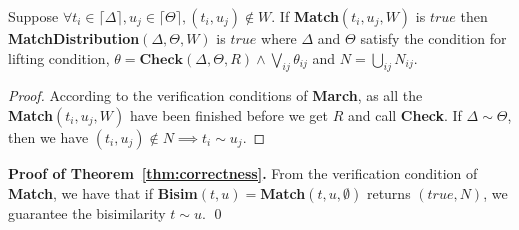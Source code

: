 \documentclass[a4paper,UKenglish,cleveref, autoref]{lipics-v2019}
\begin{document}
\begin{proposition}
Suppose $\forall t_i\in\lceil\Delta\rceil,u_j\in\lceil\Theta\rceil , (t_i,u_j)\notin W$.
If \textbf{Match}$(t_i,u_j,W)$ is $true$ then \textbf{MatchDistribution}$(\Delta,\Theta,W)$ is $true$ where $\Delta$ and $\Theta$ satisfy the condition for lifting condition, $\theta=\textbf{Check}(\Delta,\Theta,\textit{R})\wedge\bigvee_{ij}\theta_{ij}$  and $N=\bigcup_{ij}N_{ij}$.
\end{proposition}
\begin{proof}
According to the verification conditions of \textbf{March}, as all the \\\textbf{Match}$(t_i,u_j,W)$ have been finished before we get $R$ and call \textbf{Check}. If $\Delta\sim \Theta$, then we have $(t_i,u_j)\notin N\implies t_i\sim u_j$.
\end{proof}

\noindent\textbf{Proof of Theorem~\ref{thm:correctness}.} 
From the verification condition of \textbf{Match}, we have that if \textbf{Bisim}$(t,u)=$\textbf{Match}$(t,u,\emptyset)$ returns $(true, N)$, we guarantee the bisimilarity $t\sim u$.
\hfill\qed
\end{document}
